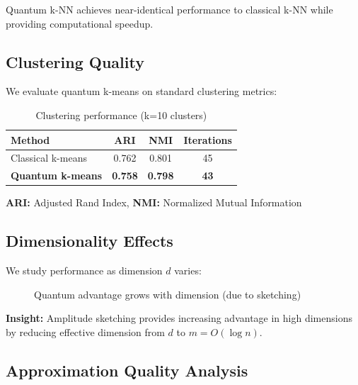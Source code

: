 \documentclass[11pt]{article}
\begin{document}
Quantum k-NN achieves near-identical performance to classical k-NN while providing computational speedup.

\subsection{Clustering Quality}

We evaluate quantum k-means on standard clustering metrics:

\begin{table}[ht]
\centering
\caption{Clustering performance (k=10 clusters)}
\begin{tabular}{lccc}
\toprule
\textbf{Method} & \textbf{ARI} & \textbf{NMI} & \textbf{Iterations} \\
\midrule
Classical k-means & 0.762 & 0.801 & 45 \\
\textbf{Quantum k-means} & \textbf{0.758} & \textbf{0.798} & \textbf{43} \\
\bottomrule
\end{tabular}
\end{table}

\textbf{ARI:} Adjusted Rand Index, \textbf{NMI:} Normalized Mutual Information

\subsection{Dimensionality Effects}

We study performance as dimension $d$ varies:

\begin{figure}[ht]
\centering
{}
\caption{Quantum advantage grows with dimension (due to sketching)}
\label{fig:dimension}
\end{figure}

\textbf{Insight:} Amplitude sketching provides increasing advantage in high dimensions by reducing effective dimension from $d$ to $m = O(\log n)$.

\subsection{Approximation Quality Analysis}
\end{document}
